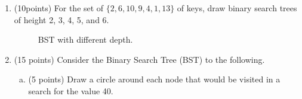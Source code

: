 \documentclass{article}
\begin{document}
\begin{enumerate}
\item(10points) For the set of $\{ 2, 6, 10, 9, 4, 1, 13\}$ of keys, draw
binary search trees of height 2, 3, 4, 5, and 6. 
\begin{figure}[H]
  \vspace{-10pt}
  \begin{center} 
    \caption{BST with different depth.\label{fig:question7}}
    \vspace{-15pt}
  \end{center}
\end{figure}


\item(15 points) Consider the Binary Search Tree (BST) to the following.
\begin{enumerate}[(a)]
\item (5 points)  Draw a circle around each node that would be visited in
a search for the value 40. \\


\end{enumerate}
\end{enumerate}
\end{document}
